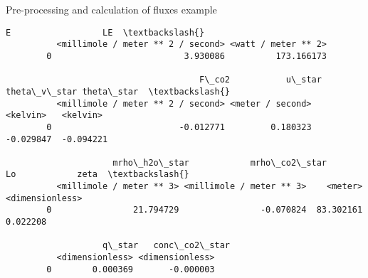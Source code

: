 \documentclass[11pt]{article}
\begin{document}
\begin{block}{Pre-processing and calculation of fluxes example}
\begin{Verbatim}[commandchars=\\\{\}]
                                          E                  LE  \textbackslash{}
          <millimole / meter ** 2 / second> <watt / meter ** 2>   
        0                          3.930086          173.166173   
        
                                      F\_co2           u\_star theta\_v\_star theta\_star  \textbackslash{}
          <millimole / meter ** 2 / second> <meter / second>     <kelvin>   <kelvin>   
        0                         -0.012771         0.180323    -0.029847  -0.094221   
        
                     mrho\_h2o\_star            mrho\_co2\_star         Lo            zeta  \textbackslash{}
          <millimole / meter ** 3> <millimole / meter ** 3>    <meter> <dimensionless>   
        0                21.794729                -0.070824  83.302161        0.022208   
        
                   q\_star   conc\_co2\_star  
          <dimensionless> <dimensionless>  
        0        0.000369       -0.000003  
\end{Verbatim}
            \end{block}
\end{document}
